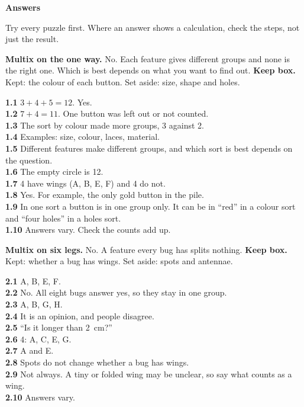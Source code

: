 \clearpage\label{answers}
{\sans\bfseries\LARGE\color{ink} Answers}\par
\footnotesize\linespread{0.94}\selectfont
Try every puzzle first. Where an answer shows a calculation, check the steps, not just the result.

\textbf{Multix on the one way.} No. Each feature gives different groups and none is the right one. Which is best depends on what you want to find out. \textbf{Keep box.} Kept: the colour of each button. Set aside: size, shape and holes.

\textbf{1.1} $3+4+5=12$. Yes.\\
\textbf{1.2} $7+4=11$. One button was left out or not counted.\\
\textbf{1.3} The sort by colour made more groups, 3 against 2.\\
\textbf{1.4} Examples: size, colour, laces, material.\\
\textbf{1.5} Different features make different groups, and which sort is best depends on the question.\\
\textbf{1.6} The empty circle is 12.\\
\textbf{1.7} 4 have wings (A, B, E, F) and 4 do not.\\
\textbf{1.8} Yes. For example, the only gold button in the pile.\\
\textbf{1.9} In one sort a button is in one group only. It can be in ``red'' in a colour sort and ``four holes'' in a holes sort.\\
\textbf{1.10} Answers vary. Check the counts add up.

\textbf{Multix on six legs.} No. A feature every bug has splits nothing. \textbf{Keep box.} Kept: whether a bug has wings. Set aside: spots and antennae.

\textbf{2.1} A, B, E, F.\\
\textbf{2.2} No. All eight bugs answer yes, so they stay in one group.\\
\textbf{2.3} A, B, G, H.\\
\textbf{2.4} It is an opinion, and people disagree.\\
\textbf{2.5} ``Is it longer than 2~cm?''\\
\textbf{2.6} 4: A, C, E, G.\\
\textbf{2.7} A and E.\\
\textbf{2.8} Spots do not change whether a bug has wings.\\
\textbf{2.9} Not always. A tiny or folded wing may be unclear, so say what counts as a wing.\\
\textbf{2.10} Answers vary.

